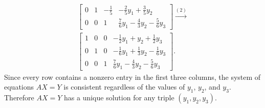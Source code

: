 \begin{solution}
\begin{gather*}
\begin{bmatrix}
      0 & 1 & -\frac15 & -\frac25y_1 + \frac35y_2 \\[3pt]
      0 & 0 & 1 & \frac76y_1 - \frac43y_2 - \frac56y_3
    \end{bmatrix}
    \xrightarrow{(2)} \\
    \begin{bmatrix}
      1 & 0 & 0 & -\frac12y_1 + y_2 + \frac12y_3 \\[3pt]
      0 & 1 & 0 & -\frac16y_1 + \frac13y_2 - \frac16y_3 \\[3pt]
      0 & 0 & 1 & \frac76y_1 - \frac43y_2 - \frac56y_3
    \end{bmatrix}.
  \end{gather*}
  Since every row contains a nonzero entry in the first three columns,
  the system of equations $AX = Y$ is consistent regardless of the
  values of $y_1$, $y_2$, and $y_3$. Therefore $AX = Y$ has a unique
  solution for any triple $(y_1,y_2,y_3)$.
\end{solution}

